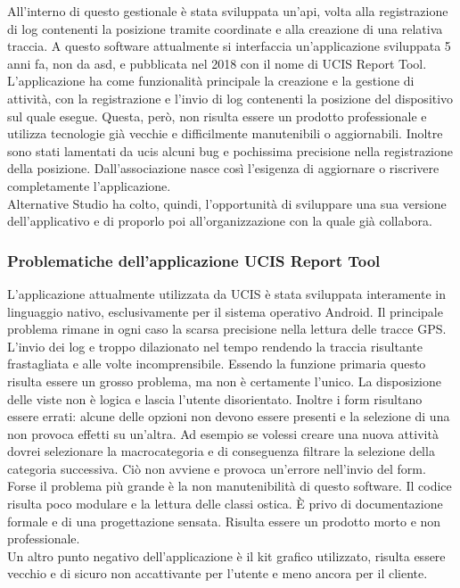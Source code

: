 
All'interno di questo gestionale è stata sviluppata un'\acrshort{api}, volta alla registrazione di log contenenti la posizione tramite
coordinate e alla creazione di una relativa traccia. A questo software attualmente si interfaccia un'applicazione sviluppata 5 anni fa, non
da \acrlong{asd}, e pubblicata nel 2018 con il nome di UCIS Report Tool. L'applicazione ha come funzionalità principale la creazione e la
gestione di attività, con la registrazione e l'invio di log contenenti la posizione del dispositivo sul quale esegue. Questa, però, non
risulta essere un prodotto professionale e utilizza tecnologie già vecchie e difficilmente manutenibili o aggiornabili. Inoltre sono stati
lamentati da \gls{ucis} alcuni bug e pochissima precisione nella registrazione della posizione. Dall'associazione nasce così l'esigenza di aggiornare
o riscrivere completamente l'applicazione. \\
\noindent Alternative Studio ha colto, quindi, l'opportunità di sviluppare una sua versione dell'applicativo e di proporlo poi all'organizzazione con la quale già collabora.

\subsubsection{Problematiche dell'applicazione UCIS Report Tool}
L'applicazione attualmente utilizzata da UCIS è stata sviluppata interamente in linguaggio nativo, esclusivamente per il
sistema operativo \gls{Android}. Il principale problema rimane in ogni caso la scarsa precisione nella lettura delle
tracce GPS. L'invio dei log e troppo dilazionato nel tempo rendendo la traccia risultante frastagliata e alle volte
incomprensibile. Essendo la funzione primaria questo risulta essere un grosso problema, ma non è certamente l'unico. La
disposizione delle viste non è logica e lascia l'utente disorientato. Inoltre i form risultano essere errati: alcune
delle opzioni non devono essere presenti e la selezione di una non provoca effetti su un'altra. Ad esempio se volessi
creare una nuova attività dovrei selezionare la macrocategoria e di conseguenza filtrare la selezione della categoria
successiva. Ciò non avviene e provoca un'errore nell'invio del form. \\
\noindent Forse il problema più grande è la non manutenibilità di questo software. Il codice risulta poco modulare e la
lettura delle classi ostica. È privo di documentazione formale e di una progettazione sensata. Risulta essere un
prodotto morto e non professionale. \\
\noindent Un altro punto negativo dell'applicazione è il kit grafico utilizzato, risulta essere vecchio e di sicuro non
accattivante per l'utente e meno ancora per il cliente.


